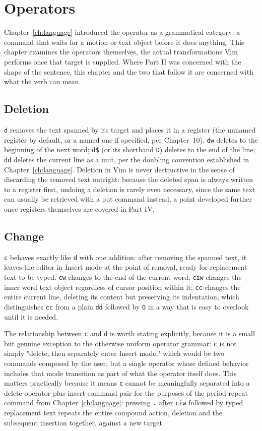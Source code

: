 \chapter{Operators}
\label{ch:operators}

Chapter~\ref{ch:language} introduced the operator as a grammatical category: a command that waits for a motion or text object before it does anything. This chapter examines the operators themselves, the actual transformations Vim performs once that target is supplied. Where Part II was concerned with the shape of the sentence, this chapter and the two that follow it are concerned with what the verb can mean.

\section{Deletion}

\texttt{d} removes the text spanned by its target and places it in a register (the unnamed register by default, or a named one if specified, per Chapter~10). \texttt{dw} deletes to the beginning of the next word; \texttt{d\$} (or its shorthand \texttt{D}) deletes to the end of the line; \texttt{dd} deletes the current line as a unit, per the doubling convention established in Chapter~\ref{ch:language}. Deletion in Vim is never destructive in the sense of discarding the removed text outright: because the deleted span is always written to a register first, undoing a deletion is rarely even necessary, since the same text can usually be retrieved with a put command instead, a point developed further once registers themselves are covered in Part IV.

\section{Change}

\texttt{c} behaves exactly like \texttt{d} with one addition: after removing the spanned text, it leaves the editor in Insert mode at the point of removal, ready for replacement text to be typed. \texttt{cw} changes to the end of the current word; \texttt{ciw} changes the inner word text object regardless of cursor position within it; \texttt{cc} changes the entire current line, deleting its content but preserving its indentation, which distinguishes \texttt{cc} from a plain \texttt{dd} followed by \texttt{O} in a way that is easy to overlook until it is needed.

The relationship between \texttt{c} and \texttt{d} is worth stating explicitly, because it is a small but genuine exception to the otherwise uniform operator grammar: \texttt{c} is not simply "delete, then separately enter Insert mode," which would be two commands composed by the user, but a single operator whose defined behavior includes that mode transition as part of what the operator itself does. This matters practically because it means \texttt{c} cannot be meaningfully separated into a delete-operator-plus-insert-command pair for the purposes of the period-repeat command from Chapter~\ref{ch:language}: pressing \texttt{.} after \texttt{ciw} followed by typed replacement text repeats the entire compound action, deletion and the subsequent insertion together, against a new target.

